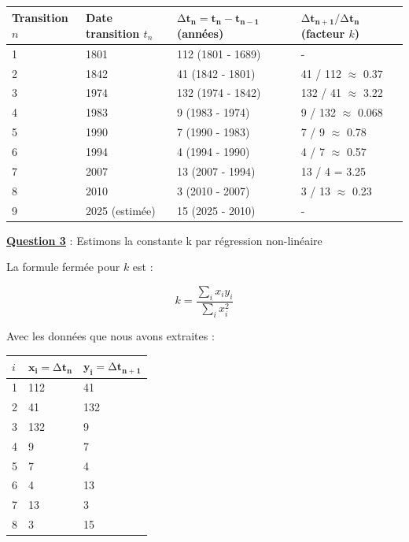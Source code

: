 \documentclass[12pt, a4paper]{article}
\newcommand{\question}[1]{\textbf{\underline{Question #1}}}
\begin{document}
\begin{enumerate}[label=\textbf{\arabic*.}, start=3]
		\begin{tabular}{|p{2cm}|p{3cm}|p{6cm}|p{6cm}|}
			\hline
			\textbf{Transition $n$} & \textbf{Date transition $t_n$} & $\mathbf{\mathrm{\Delta}}\mathbf{t}_{\mathbf{n}} = \mathbf{t}_{\mathbf{n}} - \mathbf{t}_{\mathbf{n - 1}}$ (années) & $\mathbf{\mathrm{\Delta}}\mathbf{t}_{\mathbf{n + 1}} / \mathbf{\mathrm{\Delta}}\mathbf{t}_{\mathbf{n}}$ (facteur $k$) \\
			\hline
			1 & 1801 & 112 (1801 - 1689) & - \\
			\hline
			2 & 1842 & 41 (1842 - 1801) & 41 / 112 $\approx$ 0.37 \\
			\hline
			3 & 1974 & 132 (1974 - 1842) & 132 / 41 $\approx$ 3.22 \\
			\hline
			4 & 1983 & 9 (1983 - 1974) & 9 / 132 $\approx$ 0.068 \\
			\hline
			5 & 1990 & 7 (1990 - 1983) & 7 / 9 $\approx$ 0.78 \\
			\hline
			6 & 1994 & 4 (1994 - 1990) & 4 / 7 $\approx$ 0.57 \\
			\hline
			7 & 2007 & 13 (2007 - 1994) & 13 / 4 = 3.25 \\
			\hline
			8 & 2010 & 3 (2010 - 2007) & 3 / 13 $\approx$ 0.23 \\
			\hline
			9 & 2025 (estimée) & 15 (2025 - 2010) & - \\
			\hline
		\end{tabular}
		
		\question{3} : Estimons la constante k par régression non-linéaire
		
		La formule fermée pour $k$ est :
		
		$$k = \frac{\sum_{i}^{}x_{i}y_{i}}{\sum_{i}^{}x_{i}^{2}}$$
		
		Avec les données que nous avons extraites :
		
		\begin{tabular}{|p{2cm}|p{5cm}|p{5cm}|}
			\hline
			\textbf{$i$} & $\mathbf{x}_{\mathbf{i}} = \mathrm{\Delta}\mathbf{t}_{\mathbf{n}}$ & $\mathbf{y}_{\mathbf{i}} = \mathrm{\Delta}\mathbf{t}_{\mathbf{n + 1}}$ \\
			\hline
			1 & 112 & 41 \\
			\hline
			2 & 41 & 132 \\
			\hline
			3 & 132 & 9 \\
			\hline
			4 & 9 & 7 \\
			\hline
			5 & 7 & 4 \\
			\hline
			6 & 4 & 13 \\
			\hline
			7 & 13 & 3 \\
			\hline
			8 & 3 & 15 \\
			\hline
		\end{tabular}
		

\end{enumerate}
\end{document}
